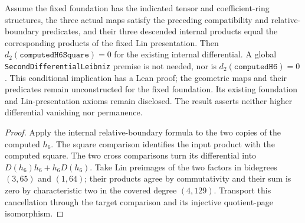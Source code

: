 \begin{proposition}
  \label{prop:h6-d2-zero-from-long-layer}
  \notready
  Assume the fixed foundation has the indicated tensor and coefficient-ring
  structures, the three actual maps satisfy the preceding compatibility
  and relative-boundary predicates, and their three descended internal
  products equal the corresponding products of the fixed Lin presentation.
  Then $d_2(\texttt{computedH6Square})=0$ for the existing internal
  differential. A global \texttt{SecondDifferentialLeibniz} premise is not
  needed, nor is $d_2(\texttt{computedH6})=0$.
  This conditional implication has a Lean proof; the geometric maps and
  their predicates remain unconstructed for the fixed foundation. Its
  existing foundation and Lin-presentation axioms remain disclosed.
  The result asserts neither higher differential vanishing nor permanence.
\end{proposition}
\begin{proof}
  Apply the internal relative-boundary formula to the two copies of the
  computed $h_6$. The square comparison identifies the input product with
  the computed square. The two cross comparisons turn its differential
  into $D(h_6)h_6+h_6D(h_6)$. Take Lin preimages of the two factors in
  bidegrees $(3,65)$ and $(1,64)$; their products agree by commutativity and
  their sum is zero by characteristic two in the covered degree $(4,129)$.
  Transport this cancellation through the target comparison and its
  injective quotient-page isomorphism.
\end{proof}

